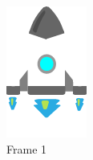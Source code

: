 \begin{figure}[!htb]
  \includegraphics[width=\linewidth]{chapters/modding/shipDetails_1.png}
  \caption*{Frame 1}
\endminipage\hfill
{}%

\end{figure}

